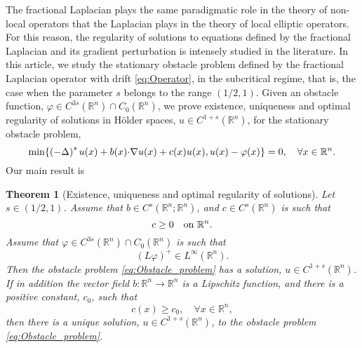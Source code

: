 \documentclass[11pt,reqno]{amsart}
\newtheorem{thm}{Theorem}[section]
\theoremstyle{definition}
\theoremstyle{remark}
\begin{document}
The fractional Laplacian plays the same paradigmatic role in the theory of non-local operators that the Laplacian plays in the theory of local elliptic operators. For this reason, the regularity of solutions to equations defined by the fractional Laplacian and its gradient perturbation is intensely studied in the literature. In this article, we study the stationary obstacle problem defined by the fractional Laplacian operator with drift \eqref{eq:Operator}, in the subcritical regime, that is, the case when the parameter $s$ belongs to the range $(1/2,1)$. Given an obstacle function, $\varphi\in C^{3s}({\mathbb{R}}^n)\cap C_0({\mathbb{R}}^n)$, we prove existence, uniqueness and optimal regularity of solutions in H\"older spaces, $u \in C^{1+s}({\mathbb{R}}^n)$, for the stationary obstacle problem,
\begin{equation}
\label{eq:Obstacle_problem}
\min\{\left(-\Delta\right)^s u(x) + b(x){\hbox{$\cdot$}}\nabla u (x)+c(x) u(x), u(x)-\varphi(x)\}=0,\quad\forall x\in {\mathbb{R}}^n.
\end{equation}
Our main result is
\begin{thm}[Existence, uniqueness and optimal regularity of solutions]
\label{thm:Solutions}
Let $s \in (1/2,1)$. Assume that $b \in C^{s}({\mathbb{R}}^n;{\mathbb{R}}^n)$, and $c \in C^{s}({\mathbb{R}}^n)$ is such that 
\begin{equation}
\label{eq:Nonnegative_lower_bound_c}
c \geq 0\quad\hbox{on }{\mathbb{R}}^n.
\end{equation}
Assume that $\varphi\in C^{3s}({\mathbb{R}}^n)\cap C_0({\mathbb{R}}^n)$ is such that 
\begin{equation}
\label{eq:Boundedness_L_phi_positive_part}
(L\varphi)^+\in L^{\infty}({\mathbb{R}}^n).
\end{equation}
Then the obstacle problem \eqref{eq:Obstacle_problem} has a solution, $u \in C^{1+s}({\mathbb{R}}^n)$. If in addition the vector field $b:{\mathbb{R}}^n\rightarrow{\mathbb{R}}^n$ is a Lipschitz function, and there is a positive constant, $c_0$, such that
\begin{equation}
\label{eq:Lower_bound_c}
c(x)\geq c_0,\quad\forall x\in {\mathbb{R}}^n,
\end{equation}
then there is a unique solution, $u \in C^{1+s}({\mathbb{R}}^n)$, to the obstacle problem \eqref{eq:Obstacle_problem}.
\end{thm}
\end{document}
